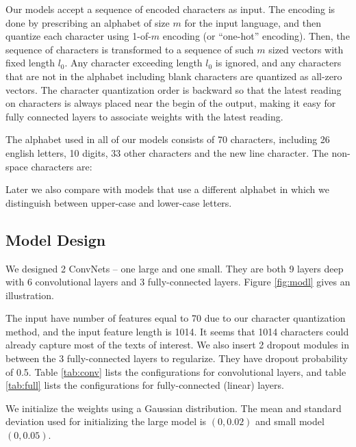 Our models accept a sequence of encoded characters as input. The encoding is done by prescribing an alphabet of size \(m\) for the input language, and then quantize each character using 1-of-\(m\) encoding (or ``one-hot'' encoding). Then, the sequence of characters is transformed to a sequence of such \(m\) sized vectors with fixed length \(l_0\). Any character exceeding length \(l_0\) is ignored, and any characters that are not in the alphabet including blank characters are quantized as all-zero vectors. The character quantization order is backward so that the latest reading on characters is always placed near the begin of the output, making it easy for fully connected layers to associate weights with the latest reading.

The alphabet used in all of our models consists of 70 characters, including 26 english letters, 10 digits, 33 other characters and the new line character. The non-space characters are:


Later we also compare with models that use a different alphabet in which we distinguish between upper-case and lower-case letters.

\subsection{Model Design}

We designed 2 ConvNets -- one large and one small. They are both 9 layers deep with 6 convolutional layers and 3 fully-connected layers. Figure \ref{fig:modl} gives an illustration.

The input have number of features equal to 70 due to our character quantization method, and the input feature length is 1014. It seems that 1014 characters could already capture most of the texts of interest. We also insert 2 dropout\cite{HSKSS12} modules in between the 3 fully-connected layers to regularize. They have dropout probability of 0.5. Table \ref{tab:conv} lists the configurations for convolutional layers, and table \ref{tab:full} lists the configurations for fully-connected (linear) layers.

We initialize the weights using a Gaussian distribution. The mean and standard deviation used for initializing the large model is \((0, 0.02)\) and small model \((0, 0.05)\).

